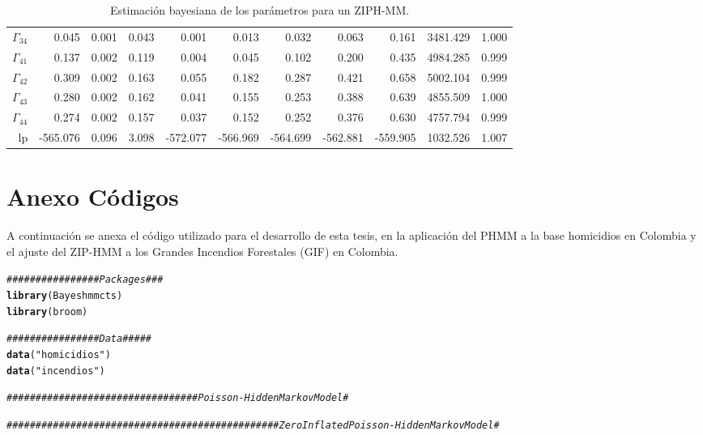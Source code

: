 \documentclass[a4paper]{article}\usepackage[]{graphicx}\usepackage[]{color}
\makeatletter
\newcommand{\hlstr}[1]{\textcolor[rgb]{0.192,0.494,0.8}{#1}}%
\newcommand{\hlcom}[1]{\textcolor[rgb]{0.678,0.584,0.686}{\textit{#1}}}%
\newcommand{\hlstd}[1]{\textcolor[rgb]{0.345,0.345,0.345}{#1}}%
\newcommand{\hlkwd}[1]{\textcolor[rgb]{0.737,0.353,0.396}{\textbf{#1}}}%
\newenvironment{kframe}{%
 \def\at@end@of@kframe{}%
 \ifinner\ifhmode%
  \def\at@end@of@kframe{\end{minipage}}%
  \begin{minipage}{\columnwidth}%
 \fi\fi%
 \def\FrameCommand##1{\hskip\@totalleftmargin \hskip-\fboxsep
 \colorbox{shadecolor}{##1}\hskip-\fboxsep
     \hskip-\linewidth \hskip-\@totalleftmargin \hskip\columnwidth}%
 \MakeFramed {\advance\hsize-\width
   \@totalleftmargin\z@ \linewidth\hsize
   \@setminipage}}%
 {\par\unskip\endMakeFramed%
 \at@end@of@kframe}
\newenvironment{knitrout}{}{} %
\makeatother
\begin{document}
\begin{table}[ht]
\begin{tabular}{rrrrrrrrrrr}
  $\Gamma_{34}$ & 0.045 & 0.001 & 0.043 & 0.001 & 0.013 & 0.032 & 0.063 & 0.161 & 3481.429 & 1.000 \\ 
  $\Gamma_{41}$ & 0.137 & 0.002 & 0.119 & 0.004 & 0.045 & 0.102 & 0.200 & 0.435 & 4984.285 & 0.999 \\ 
  $\Gamma_{42}$ & 0.309 & 0.002 & 0.163 & 0.055 & 0.182 & 0.287 & 0.421 & 0.658 & 5002.104 & 0.999 \\ 
  $\Gamma_{43}$ & 0.280 & 0.002 & 0.162 & 0.041 & 0.155 & 0.253 & 0.388 & 0.639 & 4855.509 & 1.000 \\ 
  $\Gamma_{44}$ & 0.274 & 0.002 & 0.157 & 0.037 & 0.152 & 0.252 & 0.376 & 0.630 & 4757.794 & 0.999 \\ 
  lp & -565.076 & 0.096 & 3.098 & -572.077 & -566.969 & -564.699 & -562.881 & -559.905 & 1032.526 & 1.007 \\ 
   \hline
\end{tabular}
\caption{Estimación bayesiana de los parámetros para un ZIPH-MM.} 
\end{table}


\section{Anexo Códigos}

A continuación se anexa el código utilizado para el desarrollo de esta tesis, en la aplicación del PHMM a la base homicidios en Colombia y el ajuste del ZIP-HMM a los Grandes Incendios Forestales (GIF) en Colombia. 

\clearpage

\begin{knitrout}
\color{fgcolor}\begin{kframe}
\begin{alltt}
\hlcom{################ Packages ###}
\hlkwd{library}\hlstd{(Bayeshmmcts)}
\hlkwd{library}\hlstd{(broom)}


\hlcom{################ Data #####}
\hlkwd{data}\hlstd{(}\hlstr{"homicidios"}\hlstd{)}
\hlkwd{data}\hlstd{(}\hlstr{"incendios"}\hlstd{)}

\hlcom{################################# Poisson - Hidden Markov Model #}

\hlcom{############################################### Zero Inflated Poisson - Hidden Markov Model #}
\end{alltt}
\end{kframe}
\end{knitrout}
\end{document}
